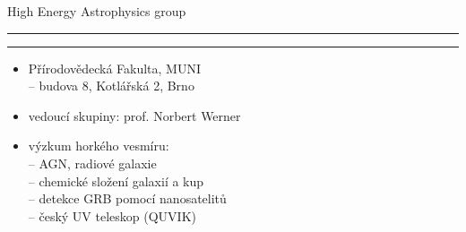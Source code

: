 \documentclass[aspectratio=43]{beamer}
\def\lend{\phantom{g}\vspace{1.5mm}\hrule\hrule}
\begin{document}
\begin{frame}{\vspace{6mm} High Energy Astrophysics group\lend}
\vspace{9.5mm}
\begin{itemize}
    \item<2> Přírodovědecká Fakulta, MUNI\\ \vspace{3mm}
        -- budova 8, Kotlářská 2, Brno\\ \vspace{4mm}
    \item<2> vedoucí skupiny: prof. Norbert Werner\\ \vspace{4mm}
    \item<2> výzkum horkého vesmíru:\\ \vspace{3mm}
        -- AGN, radiové galaxie\\ \vspace{3mm}
        -- chemické složení galaxií a kup\\ \vspace{3mm}
        -- detekce GRB pomocí nanosatelitů\\ \vspace{3mm}
        -- český UV teleskop (QUVIK)\\
\end{itemize}
\end{frame}
\end{document}
